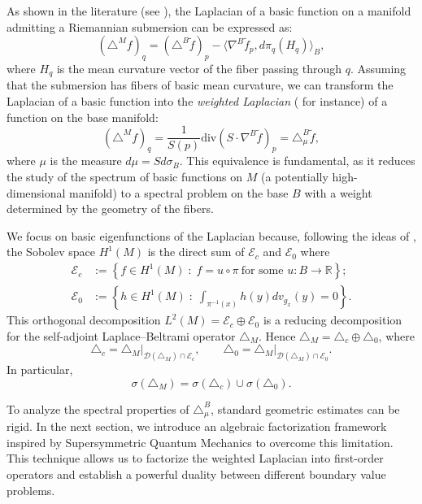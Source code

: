 \documentclass{amsart}
\theoremstyle{definition}
\theoremstyle{remark}
\numberwithin{equation}{section}
\begin{document}
As shown in the literature (see \cite{Bessa2012}), the Laplacian of a basic function on a manifold admitting a Riemannian submersion can be expressed as:
\begin{equation}\label{baseinduced}
 (\triangle^M f)_q = (\triangle^B \widetilde{f})_p - \langle \nabla^B \widetilde{f}_p, d\pi_q(H_q) \rangle_B,
\end{equation}
where $H_q$ is the mean curvature vector of the fiber passing through $q$. Assuming that the submersion has fibers of basic mean curvature, we can transform the Laplacian of a basic function into the \emph{weighted Laplacian} (\cite{GriBook} for instance) of a function on the base manifold:
\begin{equation}\label{weightedlaplacian_en}
 (\triangle^M f)_q = \frac{1}{S(p)} \text{div} \left( S \cdot \nabla^B \widetilde{f} \right)_p = \triangle_{\mu}^B \widetilde{f},
\end{equation}
where $\mu$ is the measure $d\mu = S d\sigma_B$. This equivalence is fundamental, as it reduces the study of the spectrum of basic functions on $M$ (a potentially high-dimensional manifold) to a spectral problem on the base $B$ with a weight determined by the geometry of the fibers.

We focus on basic eigenfunctions of the Laplacian because, following the ideas of \cite[Theorem 1.6]{Bordoni2006}, the Sobolev space $H^{1}(M)$ is the direct sum of
$\mathcal{E}_c$ and $\mathcal{E}_0$ where
\begin{equation}\label{eq:EcE0}
\begin{aligned}
\mathcal{E}_c &:= \left\{ f \in H^1(M) \;:\; f=u\circ\pi \ \text{for some } u:B \to \mathbb{R}
\right\}; \\
\mathcal{E}_0 &:= \left\{ h \in H^1(M) \;:\; \int_{\pi^{-1}(x)} h(y)dv_{g_x}(y)=0 \right\}.
\end{aligned}
\end{equation}
This orthogonal decomposition $L^2(M)=\mathcal E_c\oplus \mathcal E_0$ is a reducing decomposition for the self-adjoint Laplace--Beltrami operator $\triangle_M$. Hence $\triangle_M=\triangle_c\oplus\triangle_0$, where
\[
\triangle_c = \left.\triangle_M\right|_{\mathcal D(\triangle_M)\cap\mathcal E_c}, \qquad \triangle_0 = \left. \triangle_M \right|_{\mathcal D(\triangle_M)\cap\mathcal E_0}.
\]
In particular,
\[
\sigma(\triangle_M)=\sigma(\triangle_c)\cup\sigma(\triangle_0).
\]

To analyze the spectral properties of $\triangle_{\mu}^B$, standard geometric estimates can be rigid. In the next section, we introduce an algebraic factorization framework inspired by Supersymmetric Quantum Mechanics to overcome this limitation. This technique allows us to factorize the weighted Laplacian into first-order operators and establish a powerful duality between different boundary value problems.
\end{document}
